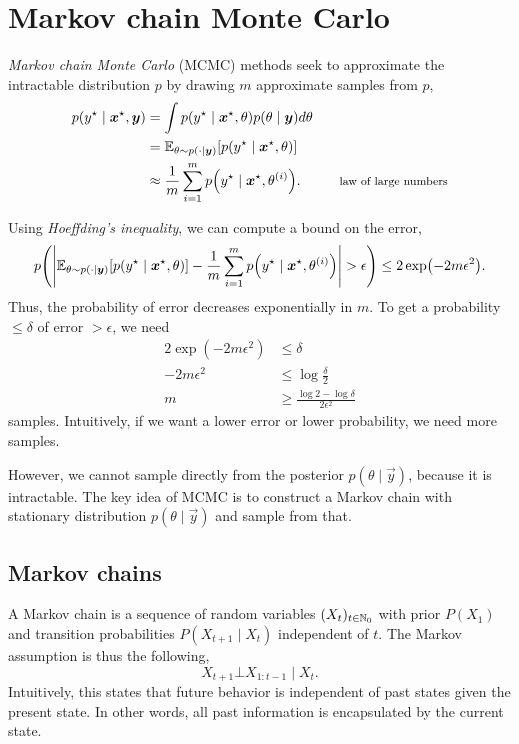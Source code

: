 \section{Markov chain Monte Carlo} \label{sec:mcmc}

\textit{Markov chain Monte Carlo} (MCMC) methods seek to approximate the
intractable distribution $p$ by drawing $m$ approximate samples from $p$,
\begin{align*}
  p(y^\star\mid\bm{x}^\star, \vec{y}) &= \int p(y^\star\mid\bm{x}^\star,\theta) p(\theta\mid \vec{y}) d\theta \\
  &= \E_{\theta\sim p(\cdot\mid \vec{y})} [p(y^\star\mid\bm{x}^\star,\theta)] \\
  &\approx \frac{1}{m} \sum_{i=1}^m p \lft( y^\star\mid\vec{x}^\star,\theta^{(i)} \rgt). & \text{\footnotesize law of large numbers}
\end{align*}

Using \textit{Hoeffding's inequality}, we can compute a bound on the error, \[
  p\lft( \lft|\E_{\theta\sim p(\cdot\mid\vec{y})}[p(y^\star\mid\bm{x}^\star,\theta)] - \frac{1}{m}\sum_{i=1}^m p \lft( y^\star\mid\bm{x}^\star,\theta^{(i)} \rgt)\rgt| > \epsilon \rgt) \leq 2\exp \lft( -2m\epsilon^2 \rgt)
.\]
Thus, the probability of error decreases exponentially in $m$. To get a
probability $\leq \delta$ of error $> \epsilon$, we need
\begin{align*}
  2\exp(-2m\epsilon^2) &\leq \delta \\
  -2m\epsilon^2 &\leq \log \frac{\delta}{2} \\
  m &\geq \frac{\log 2 - \log \delta}{2\epsilon^2}
\end{align*}
samples. Intuitively, if we want a lower error or lower probability, we need
more samples.

However, we cannot sample directly from the posterior $p(\theta\mid\vec{y})$,
because it is intractable. The key idea of MCMC is to construct a Markov
chain with stationary distribution $p(\theta\mid\vec{y})$ and sample from
that.

\subsection{Markov chains}

\begin{definition}
  A Markov chain is a sequence of random variables $(X_t)_{t\in\mathbb{N}_0}$ with
  prior $P(X_1)$ and transition probabilities $P(X_{t+1}\mid X_t)$ independent
  of $t$. The Markov assumption is thus the following, \[
    X_{t+1} \bot X_{1:t-1} \mid X_t
  .\]
  Intuitively, this states that future behavior is independent of past states
  given the present state. In other words, all past information is encapsulated
  by the current state.
\end{definition}

